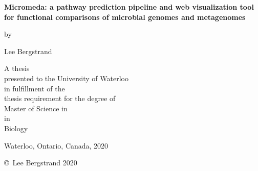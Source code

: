 \pagestyle{empty}

\begin{titlepage}
        \begin{center}
        \vspace*{1.0cm}

        \Huge
        {\bf Micromeda: a pathway prediction pipeline and web visualization tool for functional comparisons of microbial genomes and metagenomes}

        \vspace*{1.0cm}

        \normalsize
        by \\

        \vspace*{1.0cm}

        \Large
        Lee Bergstrand \\

        \vspace*{3.0cm}

        \normalsize
        A thesis \\
        presented to the University of Waterloo \\ 
        in fulfillment of the \\
        thesis requirement for the degree of \\
        Master of Science in \\
        in \\
        Biology \\

        \vspace*{2.0cm}

        Waterloo, Ontario, Canada, 2020 \\

        \vspace*{1.0cm}

        \copyright\ Lee Bergstrand 2020 \\
        \end{center}
\end{titlepage}

\pagestyle{plain}
\setcounter{page}{2}

